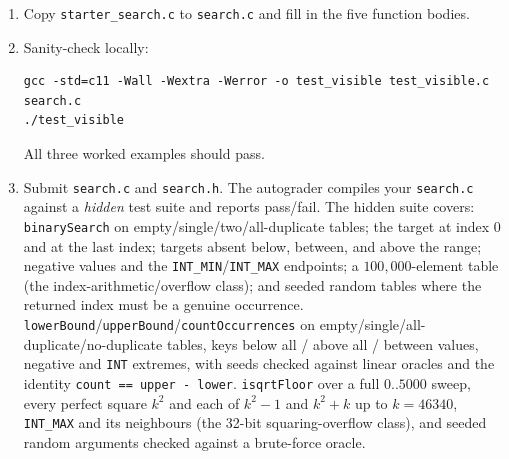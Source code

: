 \documentclass[11pt]{article}
\begin{document}
\begin{enumerate}
  \item Copy \texttt{starter\_search.c} to \texttt{search.c} and fill in the five function bodies.
  \item Sanity-check locally:
\begin{verbatim}
gcc -std=c11 -Wall -Wextra -Werror -o test_visible test_visible.c search.c
./test_visible
\end{verbatim}
    All three worked examples should pass.
  \item Submit \texttt{search.c} and \texttt{search.h}. The autograder compiles your \texttt{search.c} against a \emph{hidden} test suite and reports pass/fail. The hidden suite covers: \texttt{binarySearch} on empty/single/two/all-duplicate tables; the target at index $0$ and at the last index; targets absent below, between, and above the range; negative values and the \texttt{INT\_MIN}/\texttt{INT\_MAX} endpoints; a $100{,}000$-element table (the index-arithmetic/overflow class); and seeded random tables where the returned index must be a genuine occurrence. \texttt{lowerBound}/\texttt{upperBound}/\texttt{countOccurrences} on empty/single/all-duplicate/no-duplicate tables, keys below all / above all / between values, negative and \texttt{INT} extremes, with seeds checked against linear oracles and the identity \texttt{count == upper - lower}. \texttt{isqrtFloor} over a full $0..5000$ sweep, every perfect square $k^2$ and each of $k^2-1$ and $k^2+k$ up to $k = 46340$, \texttt{INT\_MAX} and its neighbours (the 32-bit squaring-overflow class), and seeded random arguments checked against a brute-force oracle.
\end{enumerate}
\end{document}
